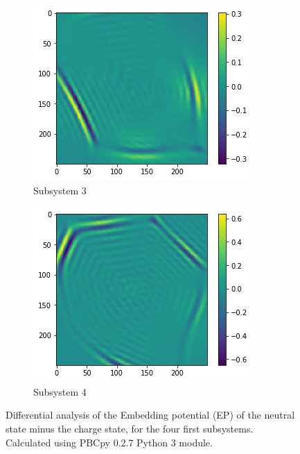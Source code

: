 \documentclass[12pt,a4paper]{article}
\begin{document}
\begin{figure}[!ht]
        \begin{subfigure}{0.4\linewidth}
                \includegraphics[width=\linewidth]{Neutral_ChargedEP_3}
                \caption{Subsystem 3}
        \end{subfigure}
        \begin{subfigure}{0.4\linewidth}
                \includegraphics[width=\linewidth]{Neutral_ChargedEP_4}
                \caption{Subsystem 4}
        \end{subfigure}
        \caption{Differential analysis of the Embedding potential (EP) of the neutral state minus the charge state, for the four first subsystems. Calculated using PBCpy 0.2.7 Python 3 module.}
\end{figure}
\end{document}
